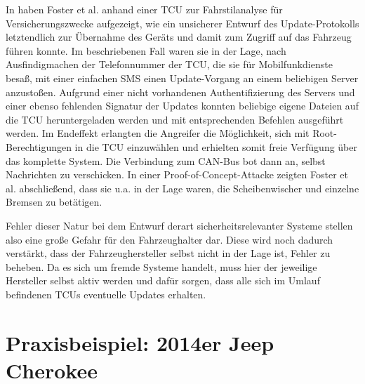 \documentclass[
    fontsize=12pt,
    headings=small,
    parskip=half,           %
    bibliography=totoc,
    numbers=noenddot,       %
    open=any,               %
    ]{scrreprt}
\begin{document}
In \cite{FPK15} haben Foster et al. anhand einer TCU zur Fahrstilanalyse für Versicherungszwecke aufgezeigt, wie ein unsicherer Entwurf des Update-Protokolls letztendlich zur Übernahme des Geräts und damit zum Zugriff auf das Fahrzeug führen konnte. Im beschriebenen Fall waren sie in der Lage, nach Ausfindigmachen der Telefonnummer der TCU, die sie für Mobilfunkdienste besaß, mit einer einfachen SMS einen Update-Vorgang an einem beliebigen Server anzustoßen.
Aufgrund einer nicht vorhandenen Authentifizierung des Servers und einer ebenso fehlenden Signatur der Updates konnten beliebige eigene Dateien auf die TCU heruntergeladen werden und mit entsprechenden Befehlen ausgeführt werden. Im Endeffekt erlangten die Angreifer die Möglichkeit, sich mit Root-Berechtigungen in die TCU einzuwählen und erhielten somit freie Verfügung über das komplette System. Die Verbindung zum CAN-Bus bot dann an, selbst Nachrichten zu verschicken. In einer Proof-of-Concept-Attacke zeigten Foster et al. abschließend, dass sie u.a. in der Lage waren, die Scheibenwischer und einzelne Bremsen zu betätigen. \par
Fehler dieser Natur bei dem Entwurf derart sicherheitsrelevanter Systeme stellen also eine große Gefahr für den Fahrzeughalter dar. Diese wird noch dadurch verstärkt, dass der Fahrzeughersteller selbst nicht in der Lage ist, Fehler zu beheben. Da es sich um fremde Systeme handelt, muss hier der jeweilige Hersteller selbst aktiv werden und dafür sorgen, dass alle sich im Umlauf befindenen TCUs eventuelle Updates erhalten.

\section{Praxisbeispiel: 2014er Jeep Cherokee}
\end{document}
